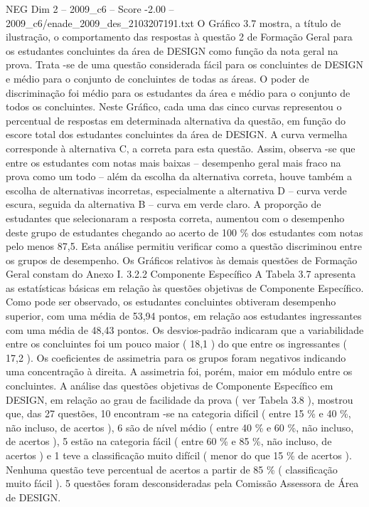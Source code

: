 \begin{textsample}{NEG Dim 2 – 2009\_c6 – Score -2.00 – 2009\_c6/enade\_2009\_des\_2103207191.txt}
O Gráfico 3.7 mostra, a título de ilustração, o comportamento das respostas à questão 2 de Formação Geral para os estudantes concluintes da área de DESIGN como função da nota geral na prova.
Trata -se de uma questão considerada fácil para os concluintes de DESIGN e médio para o conjunto de concluintes de todas as áreas.
O poder de discriminação foi médio para os estudantes da área e médio para o conjunto de todos os concluintes.
Neste Gráfico, cada uma das cinco curvas representou o percentual de respostas em determinada alternativa da questão, em função do escore total dos estudantes concluintes da área de DESIGN.
A curva vermelha corresponde à alternativa C, a correta para esta questão.
Assim, observa -se que entre os estudantes com notas mais baixas – desempenho geral mais fraco na prova como um todo – além da escolha da alternativa correta, houve também a escolha de alternativas incorretas, especialmente a alternativa D – curva verde escura, seguida da alternativa B – curva em verde claro.
A proporção de estudantes que selecionaram a resposta correta, aumentou com o desempenho deste grupo de estudantes chegando ao acerto de 100 \% dos estudantes com notas pelo menos 87,5.
Esta análise permitiu verificar como a questão discriminou entre os grupos de desempenho.
Os Gráficos relativos às demais questões de Formação Geral constam do Anexo I. 3.2.2 Componente Específico A Tabela 3.7 apresenta as estatísticas básicas em relação às questões objetivas de Componente Específico.
Como pode ser observado, os estudantes concluintes obtiveram desempenho superior, com uma média de 53,94 pontos, em relação aos estudantes ingressantes com uma média de 48,43 pontos.
Os desvios-padrão indicaram que a variabilidade entre os concluintes foi um pouco maior ( 18,1 ) do que entre os ingressantes ( 17,2 ).
Os coeficientes de assimetria para os grupos foram negativos indicando uma concentração à direita.
A assimetria foi, porém, maior em módulo entre os concluintes.
A análise das questões objetivas de Componente Específico em DESIGN, em relação ao grau de facilidade da prova ( ver Tabela 3.8 ), mostrou que, das 27 questões, 10 encontram -se na categoria difícil ( entre 15 \% e 40 \%, não incluso, de acertos ), 6 são de nível médio ( entre 40 \% e 60 \%, não incluso, de acertos ), 5 estão na categoria fácil ( entre 60 \% e 85 \%, não incluso, de acertos ) e 1 teve a classificação muito difícil ( menor do que 15 \% de acertos ).
Nenhuma questão teve percentual de acertos a partir de 85 \% ( classificação muito fácil ). 5 questões foram desconsideradas pela Comissão Assessora de Área de DESIGN.

\end{textsample}
